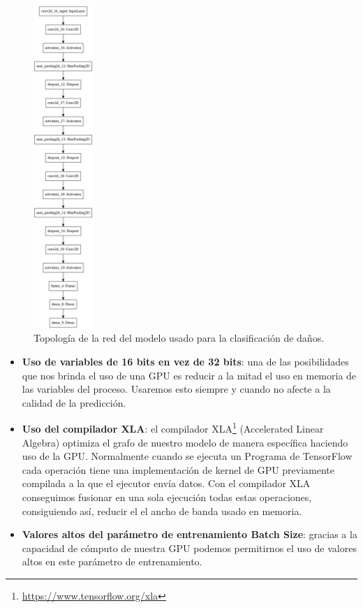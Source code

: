 \begin{figure}
    \centering
    \includegraphics[width=0.2\textwidth]{images/chapter2/model.png}
    \caption{Topología de la red del modelo  usado para la clasificación de daños.}
    \label{fig:Topología de la red del modelo de redes neuronales.}
\end{figure}


\begin{itemize}
    \item \textbf{Uso de variables de 16 bits en vez de 32 bits}: una de las posibilidades que nos brinda el uso de una GPU es reducir a la mitad el uso en memoria de las variables del proceso.
    Usaremos esto siempre y cuando no afecte a la calidad de la predicción.
    \item \textbf{Uso del compilador XLA}: el compilador XLA\footnote{\url{https://www.tensorflow.org/xla}} (Accelerated Linear Algebra) optimiza el grafo de nuestro modelo de manera específica haciendo uso de la GPU.
    Normalmente cuando se ejecuta un Programa de TensorFlow cada operación tiene una implementación de kernel de GPU previamente compilada a la que el ejecutor envía datos.
    Con el compilador XLA conseguimos fusionar en una sola ejecución todas estas operaciones, consiguiendo así, reducir el el ancho de banda usado en memoria.
    \item \textbf{Valores altos del parámetro de entrenamiento Batch Size}: gracias a la capacidad de cómputo de nuestra GPU podemos permitirnos el uso de valores altos en este parámetro de entrenamiento.
\end{itemize}


